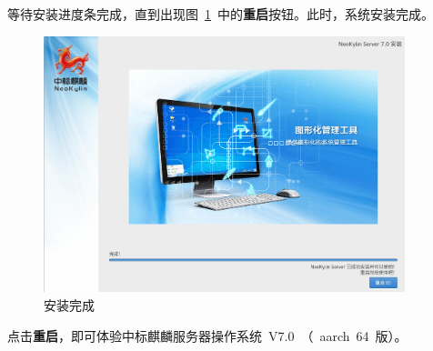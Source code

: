 \documentclass[a4paper]{ctexart}
\begin{document}
等待安装进度条完成，直到出现图~\ref{fig:installation-progress-complete}~中的\textbf{重启}按钮。此时，系统安装完成。

\clearpage

\begin{figure}[htp]
	\centering
	\includegraphics[width=10.5cm]{ns7/installation-progress-complete}
	\caption{安装完成}\label{fig:installation-progress-complete}
\end{figure}

点击\textbf{重启}，即可体验中标麒麟服务器操作系统~V7.0~（~aarch~64~版）。
\end{document}
